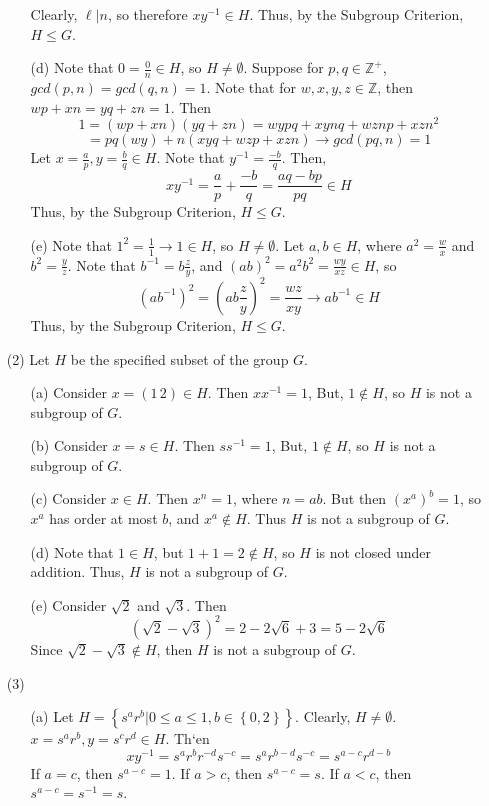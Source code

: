\documentclass[12pt]{article}
\begin{document}
\begin{itemize}
\begin{itemize}
Clearly, $\ell | n$, so therefore $xy^{-1} \in H$. Thus, by the Subgroup Criterion, $H \leq G$.
\item[(d)]
Note that $0 = \frac{0}{n} \in H$, so $H \neq \emptyset$. Suppose for $p, q \in \mathbb{Z}^+$, $gcd(p,n) = gcd(q, n) = 1$. Note that for $w, x, y, z \in \mathbb{Z}$, then $wp + xn = yq + zn = 1$. Then
$$1 = (wp + xn)(yq + zn) = wypq + xynq + wznp + xzn^2$$
$$= pq(wy) + n(xyq + wzp + xzn) \rightarrow gcd(pq, n) = 1$$
Let $x = \frac{a}{p}, y = \frac{b}{q} \in H$. Note that $y^{-1} = \frac{-b}{q}$. Then,
$$xy^{-1} = \frac{a}{p} + \frac{-b}{q} = \frac{aq - bp}{pq} \in H$$
Thus, by the Subgroup Criterion, $H \leq G$. 
\item[(e)]
Note that $1^2 = \frac{1}{1} \rightarrow 1 \in H$, so $H \neq \emptyset$. Let $a, b \in H$, where $a^2 = \frac{w}{x}$ and $b^2 = \frac{y}{z}$. Note that $b^{-1} = b\frac{z}{y}$, and $(ab)^2 = a^2b^2 = \frac{wy}{xz} \in H$, so
$$(ab^{-1})^2 = (ab\frac{z}{y})^2 = \frac{wz}{xy} \rightarrow ab^{-1} \in H$$
Thus, by the Subgroup Criterion, $H \leq G$.
\end{itemize}
\item[(2)]
Let $H$ be the specified subset of the group $G$.
\begin{itemize}
\item[(a)]
Consider $x = (1 \, 2) \in H$. Then $xx^{-1} = 1$, But, $1 \not \in H$, so $H$ is not a subgroup of $G$.
\item[(b)]
Consider $x = s \in H$. Then $ss^{-1} = 1$, But, $1 \not \in H$, so $H$ is not a subgroup of $G$.
\item[(c)]
Consider $x \in H$. Then $x^n = 1$, where $n = ab$. But then $(x^a)^b = 1$, so $x^a$ has order at most $b$, and $x^a \not \in H$. Thus $H$ is not a subgroup of $G$.
\item[(d)]
Note that $1 \in H$, but $1 + 1 = 2 \not \in H$, so $H$ is not closed under addition. Thus, $H$ is not a subgroup of $G$.
\item[(e)]
Consider $\sqrt{2}$ and $\sqrt{3}$. Then 
$$(\sqrt{2} - \sqrt{3})^2 = 2 - 2\sqrt{6} + 3 = 5 - 2\sqrt{6}$$
Since $\sqrt{2} - \sqrt{3} \not \in H$, then $H$ is not a subgroup of $G$.
\end{itemize}
\item[(3)]
\begin{itemize}
\item[(a)]
Let $H = \left\lbrace s^ar^b | 0 \leq a \leq 1, b \in \left\lbrace 0, 2 \right\rbrace \right\rbrace$. Clearly, $H \neq \emptyset$. $x = s^ar^b, y = s^cr^d \in H$. Th`en
$$xy^{-1} = s^ar^br^{-d}s^{-c} = s^ar^{b - d}s^{-c} = s^{a-c}r^{d-b}$$
If $a = c$, then $s^{a-c} = 1$. If $a > c$, then $s^{a-c} = s$. If $a < c$, then $s^{a-c} = s^{-1} = s$.


\end{itemize}
\end{itemize}
\end{document}
